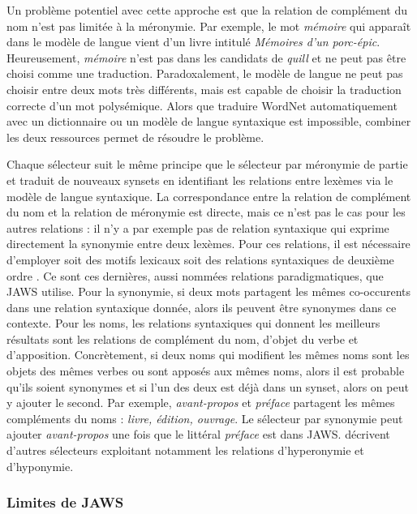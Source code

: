 Un problème potentiel avec cette approche est que la relation de complément du nom n'est pas limitée à la méronymie. Par exemple, le mot \textit{mémoire} qui apparaît dans le modèle de langue vient d'un livre intitulé \textit{Mémoires d'un porc-épic}. Heureusement, \textit{mémoire} n'est pas dans les candidats de \textit{quill} et ne peut pas être choisi comme une traduction. Paradoxalement, le modèle de langue ne peut pas choisir entre deux mots très différents, mais est capable de choisir la traduction correcte d'un mot polysémique. Alors que traduire WordNet automatiquement avec un dictionnaire ou un modèle de langue syntaxique est impossible, combiner les deux ressources permet de résoudre le problème.

Chaque sélecteur suit le même principe que le sélecteur par méronymie de partie et traduit de nouveaux synsets en identifiant les relations entre lexèmes via le modèle de langue syntaxique. La correspondance entre la relation de complément du nom et la relation de méronymie est directe, mais ce n'est pas le cas pour les autres relations : il n'y a par exemple pas de relation syntaxique qui exprime directement la synonymie entre deux lexèmes. Pour ces relations, il est nécessaire d'employer soit des motifs lexicaux \citep{hearst1992automatic} soit des relations syntaxiques de deuxième ordre \citep{lenci2012identifying}. Ce sont ces dernières, aussi nommées relations paradigmatiques, que JAWS utilise. Pour la synonymie, si deux mots partagent les mêmes co-occurents dans une relation syntaxique donnée, alors ils peuvent être synonymes dans ce contexte. Pour les noms, les relations syntaxiques qui donnent les meilleurs résultats sont les relations de complément du nom, d'objet du verbe et d'apposition. Concrètement, si deux noms qui modifient les mêmes noms sont les objets des mêmes verbes ou sont apposés aux mêmes noms, alors il est probable qu'ils soient synonymes et si l'un des deux est déjà dans un synset, alors on peut y ajouter le second. Par exemple, \textit{avant-propos} et \textit{préface} partagent les mêmes compléments du noms : \textit{livre, édition, ouvrage}. Le sélecteur par synonymie peut ajouter \textit{avant-propos} une fois que le littéral \textit{préface} est dans JAWS. \citep{mouton2010jaws,mouton2010phd} décrivent d'autres sélecteurs exploitant notamment les relations d'hyperonymie et d'hyponymie.

\subsubsection{Limites de JAWS}
\label{subsec:limitations}

